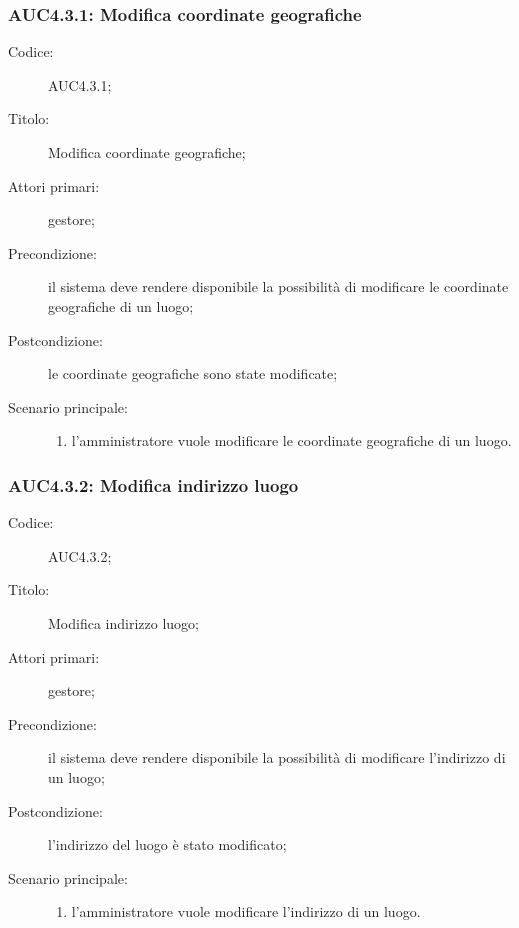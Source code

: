 \documentclass[../../../analisi-dei-requisiti.tex]{subfiles}
\begin{document}
\subsubsection{AUC4.3.1: Modifica coordinate geografiche}%
\label{subs:AUC4.3.1}
\begin{description}
  \item[Codice:] AUC4.3.1;
  \item[Titolo:] Modifica coordinate geografiche;
  \item[Attori primari:] gestore;
  \item[Precondizione:] il sistema deve rendere disponibile la possibilità di modificare le coordinate geografiche di un luogo;
  \item[Postcondizione:] le coordinate geografiche sono state modificate;
  \item[Scenario principale:]
  \begin{enumerate}
    \item l'amministratore vuole modificare le coordinate geografiche di un luogo.
  \end{enumerate}
\end{description}

\subsubsection{AUC4.3.2: Modifica indirizzo luogo}%
\label{subs:AUC4.3.2}
\begin{description}
  \item[Codice:] AUC4.3.2;
  \item[Titolo:] Modifica indirizzo luogo;
  \item[Attori primari:] gestore;
  \item[Precondizione:] il sistema deve rendere disponibile la possibilità di modificare l'indirizzo di un luogo;
  \item[Postcondizione:] l'indirizzo del luogo è stato modificato;
  \item[Scenario principale:]
  \begin{enumerate}
    \item l'amministratore vuole modificare l'indirizzo di un luogo.
  \end{enumerate}
\end{description}
\end{document}
